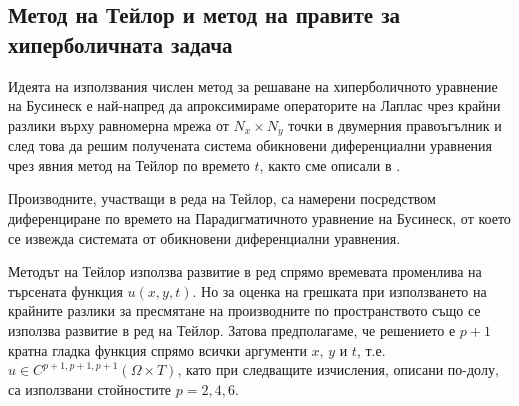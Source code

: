 \documentclass[a4paper]{article}
\theoremstyle{remark}
\begin{document}
\begin{large}
\subsection{Метод на Тейлор и метод на правите за хиперболичната задача}\label{TaylorHead}
Идеята на използвания числен метод за решаване на хиперболичното уравнение на Бусинеск е най-напред да апроксимираме операторите на Лаплас чрез крайни разлики върху равномерна мрежа от $N_x \times N_y$ точки в двумерния правоъгълник и след това да решим получената система обикновени диференциални уравнения чрез явния метод на Тейлор по времето $t$, както сме описали в \cite{refHyp}.

Производните, участващи в реда на Тейлор, са намерени посредством диференциране по времето на Парадигматичното уравнение на Бусинеск, от което се извежда системата от обикновени диференциални уравнения.

Методът на Тейлор използва развитие в ред спрямо времевата променлива на търсената функция $u(x,y,t)$. Но за оценка на грешката при използването на крайните разлики за пресмятане на производните по пространството също се използва развитие в ред на Тейлор. Затова предполагаме, че решението е $p+1$ кратна гладка функция спрямо всички аргументи $x$, $y$ и $t$, т.е. $u \in C^{p+1,p+1,p+1}(\Omega \times T)$, като при следващите изчисления, описани по-долу, са използвани стойностите $p=2,4,6$. 


\end{large}
\end{document}
